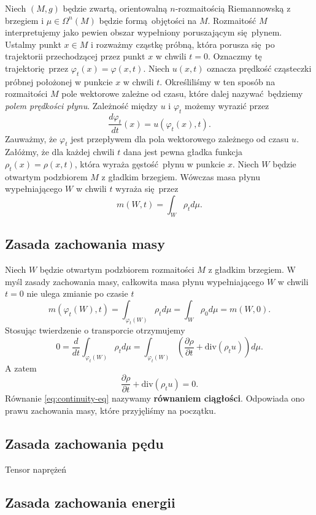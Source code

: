 Niech \((M, g)\) będzie zwartą, orientowalną \(n\)-rozmaitością Riemannowską z brzegiem i \(\mu \in \Omega^n(M)\) będzie formą objętości na \(M\). Rozmaitość \(M\) interpretujemy jako pewien obszar wypełniony poruszającym się płynem. Ustalmy punkt \(x\in M\) i rozważmy cząstkę próbną, która porusza się po trajektorii przechodzącej przez punkt \(x\) w chwili \(t=0\). Oznaczmy tę trajektorię przez \(\varphi_t(x)=\varphi(x,t)\). Niech \(u(x, t)\) oznacza prędkość cząsteczki próbnej położonej w punkcie \(x\) w chwili \(t\). Określiliśmy w ten sposób na rozmaitości \(M\) pole wektorowe zależne od czasu, które dalej nazywać będziemy \emph{polem prędkości płynu}. Zależność między \(u\) i \(\varphi_t\) możemy wyrazić przez
\begin{equation}\label{eq:first-step}
    \frac{d\varphi_t}{dt}(x) = u(\varphi_t(x), t). 
\end{equation}
Zauważmy, że \(\varphi_t\) jest przepływem dla pola wektorowego zależnego od czasu \(u\). Załóżmy, że dla każdej chwili \(t\) dana jest pewna gładka funkcja \(\rho_t(x)=\rho(x,t)\), która wyraża gęstość płynu w punkcie \(x\). Niech \(W\) będzie otwartym podzbiorem \(M\) z gładkim brzegiem. Wówczas masa płynu wypełniającego \(W\) w chwili \(t\) wyraża się przez
\begin{equation}\label{eq:mass}
    m(W,t) = \int_W \rho_t d\mu.
\end{equation}

\subsection{Zasada zachowania masy} Niech \(W\) będzie otwartym podzbiorem rozmaitości \(M\) z gładkim brzegiem. W myśl zasady zachowania masy, całkowita masa płynu wypełniającego \(W\) w chwili \(t=0\) nie ulega zmianie po czasie \(t\)
\begin{equation}\label{eq:mass-cons-1}
    m\left(\varphi_t(W), t\right) = \int_{\varphi_t(W)}\rho_t d\mu = \int_W \rho_0 d\mu = m(W, 0).
\end{equation}
Stosując twierdzenie o transporcie otrzymujemy
\begin{equation*}
    0 = \frac{d}{dt}\int_{\varphi_t(W)} \rho_t d\mu = \int_{\varphi_t(W)}\left(\frac{\partial \rho}{\partial t} + \mathrm{div}(\rho_t u) \right) d\mu.
\end{equation*}
A zatem
\begin{equation}\label{eq:continuity-eq}
\frac{\partial \rho}{\partial t} + \mathrm{div}(\rho_t u) = 0. 
\end{equation}
Równanie \eqref{eq:continuity-eq} nazywamy \textbf{równaniem ciągłości}. Odpowiada ono prawu zachowania masy, które przyjęliśmy na początku.
\subsection{Zasada zachowania pędu}
Tensor naprężeń
\subsection{Zasada zachowania energii}

